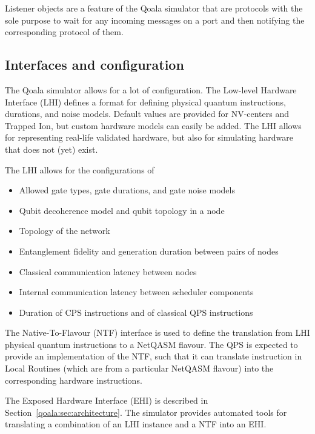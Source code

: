 Listener objects are a feature of the Qoala simulator that are protocols with the sole purpose to wait for any incoming messages on a port and then notifying the corresponding protocol of them.

\subsection{Interfaces and configuration}
The Qoala simulator allows for a lot of configuration.
The Low-level Hardware Interface (LHI) defines a format for defining physical quantum instructions, durations, and noise models.
Default values are provided for NV-centers and Trapped Ion, but custom hardware models can easily be added.
The LHI allows for representing real-life validated hardware, but also for simulating hardware that does not (yet) exist.

The LHI allows for the configurations of
\begin{itemize}
    \item Allowed gate types, gate durations, and gate noise models
    \item Qubit decoherence model and qubit topology in a node
    \item Topology of the network
    \item Entanglement fidelity and generation duration between pairs of nodes
    \item Classical communication latency between nodes
    \item Internal communication latency between scheduler components
    \item Duration of CPS instructions and of classical QPS instructions
\end{itemize}

The Native-To-Flavour (NTF) interface is used to define the translation from LHI physical quantum instructions to a NetQASM flavour.
The QPS is expected to provide an implementation of the NTF, such that it can translate instruction in Local Routines (which are from a particular NetQASM flavour) into the corresponding hardware instructions.

The Exposed Hardware Interface (EHI) is described in Section~\ref{qoala:sec:architecture}.
The simulator provides automated tools for translating a combination of an LHI instance and a NTF into an EHI.

